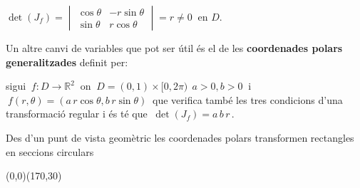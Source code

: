 \documentclass[12pt]{article}
\newcommand{\R}{\mathbb{R}}
\begin{document}
\hspace*{1cm} $\det(J_f)=
\begin{vmatrix}
\cos \theta & -r \sin \theta\\ \sin \theta & r \cos \theta
\end{vmatrix}=r\not=0\ $ en $D$.

Un altre canvi de variables que pot ser {\'u}til {\'e}s el de les
\textbf{coordenades polars generalitzades} definit per:

sigui $\ f:D\to \R^2\ $ on $\ D=(0,1)\times[0,2\pi)\ \ a>0,b>0\ $ i
$\ f(r,\theta)=(a\, r\cos \theta,b\, r\sin \theta)\ $ que verifica
tamb{\'e} les tres condicions d'una transformaci{\'o} regular i {\'e}s t{\'e} que $\
\det(J_f)=a\,
b\, r\,.$\\

\begin{observacio}
Des d'un punt de vista geom{\`e}tric les coordenades polars transformen
rectangles en seccions circulars
\end{observacio}

\vspace*{2.5cm}
\begin{center}
\begin{picture}(0,0)(170,30)
\hspace{3cm}
\end{picture}
\end{center}
\end{document}
